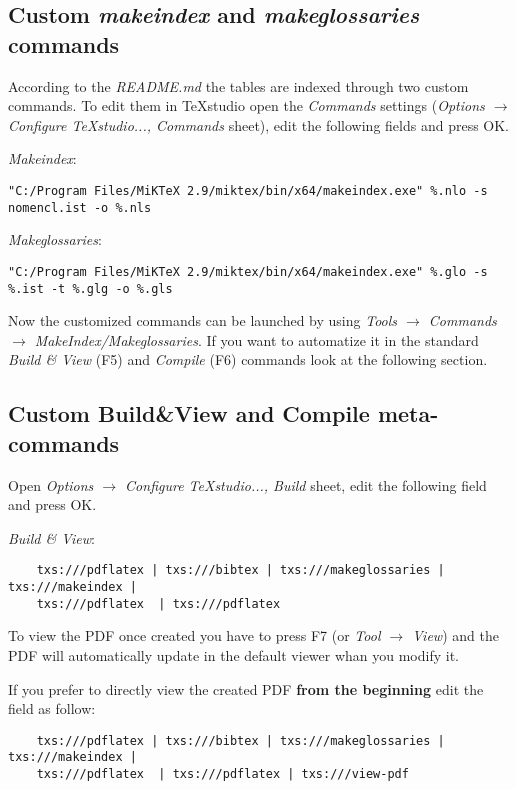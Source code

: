 \subsection{Custom \textit{makeindex} and \textit{makeglossaries} commands}

According to the \textit{README.md} the tables are indexed through two custom commands. To edit them in TeXstudio open the \textit{Commands} settings (\textit{Options $\to$ Configure TeXstudio...,  Commands} sheet), edit the following fields and press OK.

\textit{Makeindex}:
{\scriptsize
\begin{verbatim}
"C:/Program Files/MiKTeX 2.9/miktex/bin/x64/makeindex.exe" %.nlo -s nomencl.ist -o %.nls
\end{verbatim}}

\textit{Makeglossaries}:
{\scriptsize
\begin{verbatim}
"C:/Program Files/MiKTeX 2.9/miktex/bin/x64/makeindex.exe" %.glo -s %.ist -t %.glg -o %.gls
\end{verbatim}}

Now the customized commands can be launched by using \textit{Tools $\to$ Commands $\to$ MakeIndex/Makeglossaries}. If you want to automatize it in the standard \textit{Build \& View} (F5) and \textit{Compile} (F6) commands look at the following section.

\subsection{Custom Build\&View and Compile meta-commands}

Open \textit{Options $\to$ Configure TeXstudio...,  Build} sheet, edit the following field and press OK.

\textit{Build \& View}:
{\footnotesize\begin{verbatim}
	txs:///pdflatex | txs:///bibtex | txs:///makeglossaries | txs:///makeindex |
	txs:///pdflatex  | txs:///pdflatex
	\end{verbatim}}

To view the PDF once created you have to press F7 (or \textit{Tool $\to$ View}) and the PDF will automatically update in the default viewer whan you modify it. 

If you prefer to directly view the created PDF\textbf{ from the beginning }edit the field as follow:
{\footnotesize\begin{verbatim}
	txs:///pdflatex | txs:///bibtex | txs:///makeglossaries | txs:///makeindex |
	txs:///pdflatex  | txs:///pdflatex | txs:///view-pdf
	\end{verbatim}}


